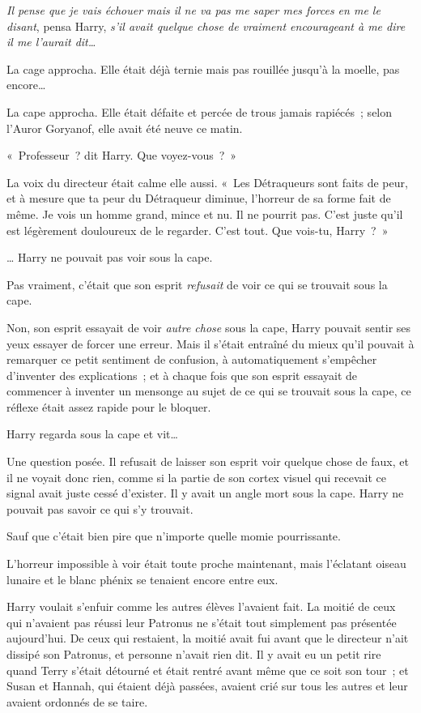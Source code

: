 \emph{Il pense que je vais échouer mais il ne va pas me saper mes forces en me le disant}, pensa Harry, \emph{s'il avait quelque chose de vraiment encourageant à me dire il me l'aurait dit…}

La cage approcha. Elle était déjà ternie mais pas rouillée jusqu'à la moelle, pas encore…

La cape approcha. Elle était défaite et percée de trous jamais rapiécés~; selon l'Auror Goryanof, elle avait été neuve ce matin.

«~Professeur~? dit Harry. Que voyez-vous~?~»

La voix du directeur était calme elle aussi. «~Les Détraqueurs sont faits de peur, et à mesure que ta peur du Détraqueur diminue, l'horreur de sa forme fait de même. Je vois un homme grand, mince et nu. Il ne pourrit pas. C'est juste qu'il est légèrement douloureux de le regarder. C'est tout. Que vois-tu, Harry~?~»

… Harry ne pouvait pas voir sous la cape.

Pas vraiment, c'était que son esprit \emph{refusait} de voir ce qui se trouvait sous la cape.

Non, son esprit essayait de voir \emph{autre chose} sous la cape, Harry pouvait sentir ses yeux essayer de forcer une erreur. Mais il s'était entraîné du mieux qu'il pouvait à remarquer ce petit sentiment de confusion, à automatiquement s'empêcher d'inventer des explications~; et à chaque fois que son esprit essayait de commencer à inventer un mensonge au sujet de ce qui se trouvait sous la cape, ce réflexe était assez rapide pour le bloquer.

Harry regarda sous la cape et vit…

Une question posée. Il refusait de laisser son esprit voir quelque chose de faux, et il ne voyait donc rien, comme si la partie de son cortex visuel qui recevait ce signal avait juste cessé d'exister. Il y avait un angle mort sous la cape. Harry ne pouvait pas savoir ce qui s'y trouvait.

Sauf que c'était bien pire que n'importe quelle momie pourrissante.

L'horreur impossible à voir était toute proche maintenant, mais l'éclatant oiseau lunaire et le blanc phénix se tenaient encore entre eux.

Harry voulait s'enfuir comme les autres élèves l'avaient fait. La moitié de ceux qui n'avaient pas réussi leur Patronus ne s'était tout simplement pas présentée aujourd'hui. De ceux qui restaient, la moitié avait fui avant que le directeur n'ait dissipé son Patronus, et personne n'avait rien dit. Il y avait eu un petit rire quand Terry s'était détourné et était rentré avant même que ce soit son tour~; et Susan et Hannah, qui étaient déjà passées, avaient crié sur tous les autres et leur avaient ordonnés de se taire.

